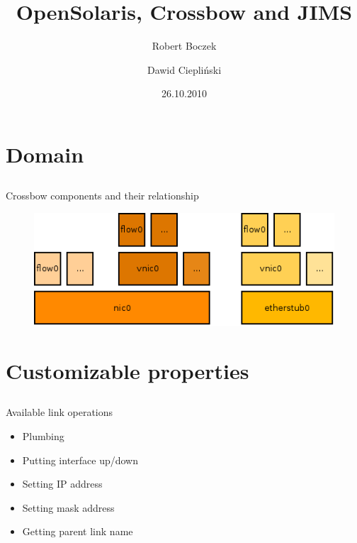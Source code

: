 \documentclass{beamer}
\title{OpenSolaris, Crossbow and JIMS}
\author{Robert Boczek \and Dawid Ciepliński}
\date{26.10.2010}
\begin{document}
\begin{frame}

	\titlepage

\end{frame}


\section{Domain}

	\subsection{}

		\begin{frame}{Crossbow components and their relationship}
		
			\begin{figure}[H]
				\includegraphics[width=\textwidth]{img/domain.png}
			\end{figure}
		
		\end{frame}


\section{Customizable properties}

	\subsection{}

		\begin{frame}{Available link operations}

			\begin{itemize}
				\item Plumbing
				\item Putting interface up/down
				\item Setting IP address
				\item Setting mask address
				\item Getting parent link name				
			\end{itemize}
		\end{frame}
\end{document}

